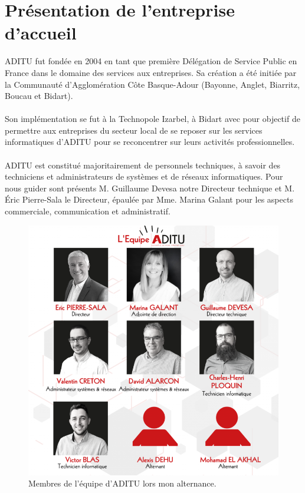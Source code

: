 \section{Présentation de l'entreprise d'accueil}
ADITU fut fondée en 2004 en tant que première Délégation de Service Public en France dans le domaine des services aux entreprises. Sa création a été initiée par la Communauté d’Agglomération Côte Basque-Adour (Bayonne, Anglet, Biarritz, Boucau et Bidart).
\\ \\
Son implémentation se fut à la Technopole Izarbel, à Bidart avec pour objectif de permettre aux entreprises du secteur local de se reposer sur les services informatiques d'ADITU pour se reconcentrer sur leurs activités professionnelles.
\\ \\
ADITU est constitué majoritairement de personnels techniques, à savoir des techniciens et administrateurs de systèmes et de réseaux informatiques. Pour nous guider sont présents M. Guillaume Devesa notre Directeur technique et M. Éric Pierre-Sala le Directeur, épaulée par Mme. Marina Galant pour les aspects commerciale, communication et administratif.
\begin{figure}[H] %
  \centering
  \captionsetup{justification=centering}
  \includegraphics[scale = 0.5]{images/equipe_aditu.png}
  \caption{Membres de l'équipe d'ADITU lors mon alternance.}  
  \label{fig:aditu_members} %
\end{figure}

